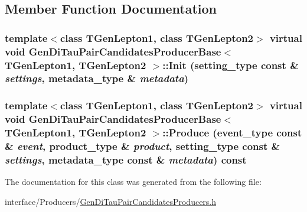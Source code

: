 \subsection{Member Function Documentation}
\hypertarget{classGenDiTauPairCandidatesProducerBase_aabb9ae3677a8ff0af3645815a3029c58}{
\subsubsection[{Init}]{\setlength{\rightskip}{0pt plus 5cm}template$<$class TGenLepton1, class TGenLepton2$>$ virtual void {\bf GenDiTauPairCandidatesProducerBase}$<$ TGenLepton1, TGenLepton2 $>$::Init (setting\_\-type const \& {\em settings}, \/  metadata\_\-type \& {\em metadata})}}
\label{classGenDiTauPairCandidatesProducerBase_aabb9ae3677a8ff0af3645815a3029c58}
\hypertarget{classGenDiTauPairCandidatesProducerBase_aaad37df429287632348ff5d1c41ea38e}{
\subsubsection[{Produce}]{\setlength{\rightskip}{0pt plus 5cm}template$<$class TGenLepton1, class TGenLepton2$>$ virtual void {\bf GenDiTauPairCandidatesProducerBase}$<$ TGenLepton1, TGenLepton2 $>$::Produce (event\_\-type const \& {\em event}, \/  product\_\-type \& {\em product}, \/  setting\_\-type const \& {\em settings}, \/  metadata\_\-type const \& {\em metadata}) const}}
\label{classGenDiTauPairCandidatesProducerBase_aaad37df429287632348ff5d1c41ea38e}


The documentation for this class was generated from the following file:\begin{DoxyCompactItemize}
\item 
interface/Producers/\hyperlink{GenDiTauPairCandidatesProducers_8h}{GenDiTauPairCandidatesProducers.h}\end{DoxyCompactItemize}

